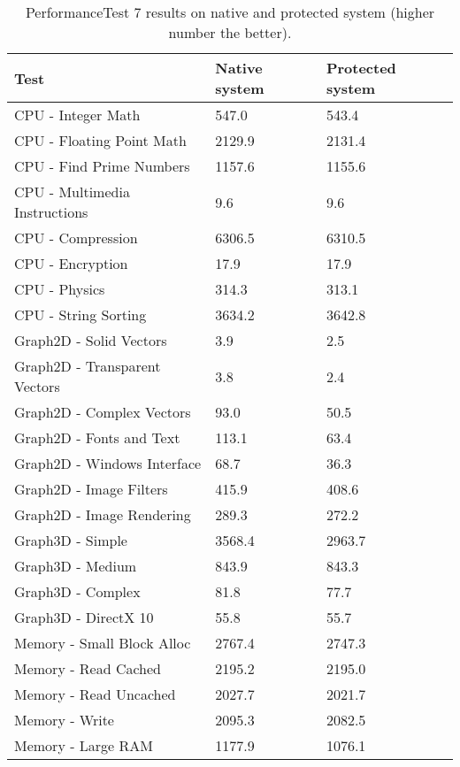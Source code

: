 \documentclass[10pt,twocolumn,a4paper]{article}
\begin{document}
\begin{table}[htbp]
  \centering
  \caption{PerformanceTest 7 results on native and protected system (higher number the better).}
    \begin{tabular}{|p{4.4cm}|p{1cm}|p{1.28cm}|}
    \addlinespace
    \toprule
    Test  &  Native system & Protected system \\
    \midrule
    CPU - Integer Math & 547.0 & 543.4 \\
   \hline
    CPU - Floating Point Math & 2129.9 & 2131.4 \\
   \hline
    CPU - Find Prime Numbers & 1157.6 & 1155.6 \\
   \hline
    CPU - Multimedia Instructions & 9.6   & 9.6 \\
\hline
    CPU - Compression & 6306.5 & 6310.5 \\
   \hline
    CPU - Encryption & 17.9  & 17.9 \\
   \hline
    CPU - Physics & 314.3 & 313.1 \\
   \hline
    CPU - String Sorting & 3634.2 & 3642.8 \\
   \hline
    Graph2D - Solid Vectors & 3.9   & 2.5 \\
   \hline
    Graph2D - Transparent Vectors & 3.8   & 2.4 \\
   \hline
    Graph2D - Complex Vectors & 93.0  & 50.5 \\
   \hline
    Graph2D - Fonts and Text & 113.1 & 63.4 \\
   \hline
    Graph2D - Windows Interface & 68.7  & 36.3 \\
   \hline
    Graph2D - Image Filters & 415.9 & 408.6 \\
   \hline
    Graph2D - Image Rendering & 289.3 & 272.2 \\
   \hline
    Graph3D - Simple & 3568.4 & 2963.7 \\
   \hline
    Graph3D - Medium & 843.9 & 843.3 \\
   \hline
    Graph3D - Complex & 81.8  & 77.7 \\
   \hline
    Graph3D - DirectX 10 & 55.8  & 55.7 \\
   \hline
    Memory - Small Block Alloc & 2767.4 & 2747.3 \\
   \hline
    Memory - Read Cached & 2195.2 & 2195.0 \\
   \hline
    Memory - Read Uncached & 2027.7 & 2021.7 \\
   \hline
    Memory - Write & 2095.3 & 2082.5 \\
   \hline
    Memory - Large RAM & 1177.9 & 1076.1 \\

\end{tabular}
\end{table}
\end{document}
